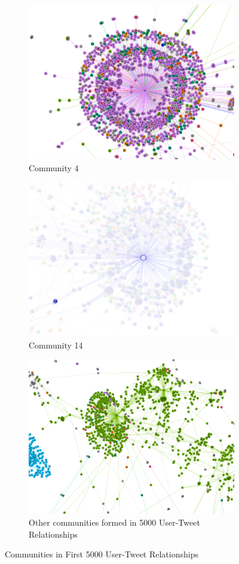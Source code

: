 \documentclass{article}
\begin{document}
\begin{figure}[h!]
\centering
\begin{subfigure}{.6\textwidth}
  \centering
  \includegraphics[width=.6\linewidth]{Graph Analytics/5k_com4.png}
  \caption{Community 4}
  \label{fig:sub1}
\end{subfigure}%
\begin{subfigure}{.6\textwidth}
  \centering
  \includegraphics[width=.6\linewidth]{Graph Analytics/5k_com14.png}
  \caption{Community 14}
  \label{fig:sub2}
\end{subfigure}
\label{fig:test}
\begin{subfigure}{.6\textwidth}
  \centering
  \includegraphics[width=.6\linewidth]{Graph Analytics/5k_com_others.png}
  \caption{Other communities formed in 5000 User-Tweet Relationships}
  \label{fig:sub2}
\end{subfigure}
\caption{Communities in First 5000 User-Tweet Relationships}
\label{fig:test}
\end{figure}
\end{document}
